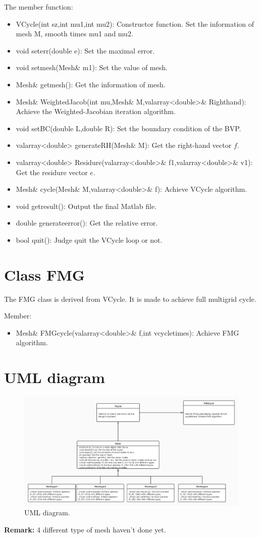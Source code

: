 \documentclass[UTF8]{ctexart}
\theoremstyle{plain}
\theoremstyle{definition}
\theoremstyle{remark}
\begin{document}
The member function:
\begin{itemize}
\item VCycle(int sz,int mu1,int mu2): Constructor function. Set the information of mesh M, smooth times mu1 and mu2.
\item void seterr(double e): Set the maximal error.
\item void setmesh(Mesh\& m1): Set the value of mesh.
\item Mesh\& getmesh(): Get the information of mesh.
\item Mesh\& WeightedJacob(int mu,Mesh\& M,valarray<double>\& Righthand): Achieve the Weighted-Jacobian iteration algorithm.
\item void setBC(double L,double R): Set the boundary condition of the BVP.
\item valarray<double> generateRH(Mesh\& M): Get the right-hand vector $f$.
\item valarray<double> Residure(valarray<double>\& f1,valarray<double>\& v1): Get the residure vector $e$.
\item Mesh\& cycle(Mesh\& M,valarray<double>\& f): Achieve VCycle algorithm.
\item void getresult(): Output the final Matlab file.
\item double generateerror(): Get the relative error.
\item bool quit(): Judge quit the VCycle loop or not.
\end{itemize}
\section*{Class FMG}

The FMG class is derived from VCycle. It is made to achieve full multigrid cycle.

Member:
\begin{itemize}
\item Mesh\& FMGcycle(valarray<double>\& f,int vcycletimes): Achieve FMG algorithm.
\end{itemize}
\section*{UML diagram}
\begin{figure}[H]
\centering
\includegraphics[height=0.4\textheight,width=0.8\linewidth]{UML}
\caption{UML diagram.}
\end{figure}

\textbf{Remark:} 4 different type of mesh haven't done yet.
\end{document}
